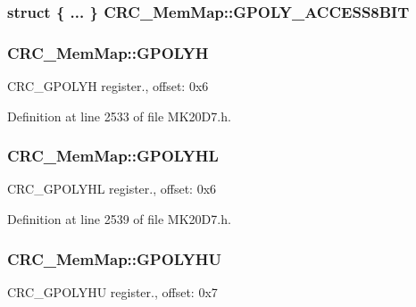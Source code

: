 \subsubsection[{\texorpdfstring{G\+P\+O\+L\+Y\+\_\+\+A\+C\+C\+E\+S\+S8\+B\+IT}{GPOLY_ACCESS8BIT}}]{\setlength{\rightskip}{0pt plus 5cm}struct \{ ... \}   C\+R\+C\+\_\+\+Mem\+Map\+::\+G\+P\+O\+L\+Y\+\_\+\+A\+C\+C\+E\+S\+S8\+B\+IT}\hypertarget{struct_c_r_c___mem_map_a304a3f70db31b034ac8c500e44606562}{}\label{struct_c_r_c___mem_map_a304a3f70db31b034ac8c500e44606562}
\subsubsection[{\texorpdfstring{G\+P\+O\+L\+YH}{GPOLYH}}]{ C\+R\+C\+\_\+\+Mem\+Map\+::\+G\+P\+O\+L\+YH}\hypertarget{struct_c_r_c___mem_map_a423da9d8034f39564aedb877f7c5043b}{}\label{struct_c_r_c___mem_map_a423da9d8034f39564aedb877f7c5043b}
C\+R\+C\+\_\+\+G\+P\+O\+L\+YH register., offset\+: 0x6 

Definition at line 2533 of file M\+K20\+D7.\+h.

\subsubsection[{\texorpdfstring{G\+P\+O\+L\+Y\+HL}{GPOLYHL}}]{ C\+R\+C\+\_\+\+Mem\+Map\+::\+G\+P\+O\+L\+Y\+HL}\hypertarget{struct_c_r_c___mem_map_a73effe5217fb833a57c7e84707e5ebe6}{}\label{struct_c_r_c___mem_map_a73effe5217fb833a57c7e84707e5ebe6}
C\+R\+C\+\_\+\+G\+P\+O\+L\+Y\+HL register., offset\+: 0x6 

Definition at line 2539 of file M\+K20\+D7.\+h.

\subsubsection[{\texorpdfstring{G\+P\+O\+L\+Y\+HU}{GPOLYHU}}]{ C\+R\+C\+\_\+\+Mem\+Map\+::\+G\+P\+O\+L\+Y\+HU}\hypertarget{struct_c_r_c___mem_map_ae7c166006427c82d21b88417313cf511}{}\label{struct_c_r_c___mem_map_ae7c166006427c82d21b88417313cf511}
C\+R\+C\+\_\+\+G\+P\+O\+L\+Y\+HU register., offset\+: 0x7 

